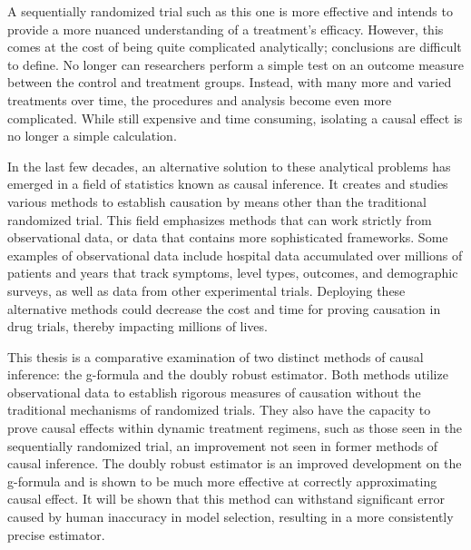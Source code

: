 A sequentially randomized trial such as this one is more effective and intends to provide a more nuanced understanding of a treatment's efficacy.  However, this comes at the cost of being quite complicated analytically; conclusions are difficult to define.  No longer can researchers perform a simple test on an outcome measure between the control and treatment groups.  Instead, with many more and varied treatments over time, the procedures and analysis become even more complicated.  While still expensive and time consuming, isolating a causal effect is no longer a simple calculation.  
 
In the last few decades, an alternative solution to these analytical problems has emerged in a field of statistics known as causal inference.  It creates and studies various methods to establish causation by means other than the traditional randomized trial.  This field emphasizes methods that can work strictly from observational data, or data that contains more sophisticated frameworks.  Some examples of observational data include hospital data accumulated over millions of patients and years that track symptoms, level types, outcomes, and demographic surveys, as well as data from other experimental trials.  Deploying these alternative methods could decrease the cost and time for proving causation in drug trials, thereby impacting millions of lives.  

This thesis is a comparative examination of two distinct methods of causal inference: the g-formula and the doubly robust estimator.  Both methods utilize observational data to establish rigorous measures of causation without the traditional mechanisms of randomized trials.  They also have the capacity to prove causal effects within dynamic treatment regimens, such as those seen in the sequentially randomized trial, an improvement not seen in former methods of causal inference.  The doubly robust estimator is an improved development on the g-formula and is shown to be much more effective at correctly approximating causal effect.  It will be shown that this method can withstand significant error caused by human inaccuracy in model selection, resulting in a more consistently precise estimator.  


